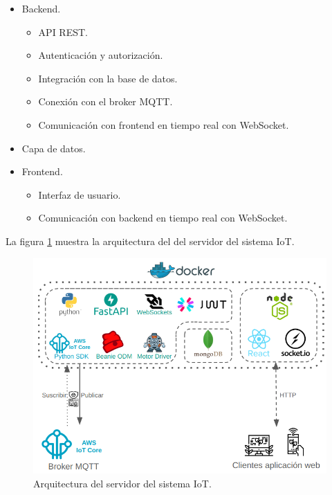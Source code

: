 \begin{itemize}
    \item Backend.
          \begin{itemize}
              \item API REST.
              \item Autenticación y autorización.
              \item Integración con la base de datos.
              \item Conexión con el broker MQTT.
              \item Comunicación con frontend en tiempo real con WebSocket.
          \end{itemize}
    \item Capa de datos.
    \item Frontend.
          \begin{itemize}
              \item Interfaz de usuario.
              \item Comunicación con backend en tiempo real con WebSocket.
          \end{itemize}
\end{itemize}

La figura \ref{fig:arquitectura servidor} muestra la arquitectura del del
servidor del sistema IoT.

\begin{figure}[H]
    \centering
    \includegraphics[width=.97\textwidth]{./Images/16.png}
    \caption{Arquitectura del servidor del sistema IoT.}
    \label{fig:arquitectura servidor}
\end{figure}

